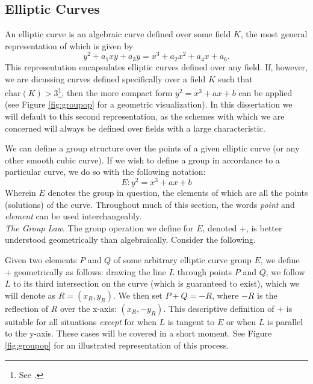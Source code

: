 \subsection{Elliptic Curves}

An elliptic curve is an algebraic curve defined over some field $K$, the most general representation of which is given by
$$
y^2 + a_{1}xy + a_{3}y = x^3 + a_{2}x^2 + a_{4}x + a_6.
$$
This representation encapsulates elliptic curves defined over any field. If, however, we are dicussing curves defined specifically over a field $K$ such that $\text{char}(K) > 3$\footnote{See \cite{silverman}.}, then the more compact form $y^2 = x^3 + ax + b$ can be applied (see Figure \ref{fig:groupop} for a geometric visualization). In this dissertation we will default to this second representation, as the schemes with which we are concerned will always be defined over fields with a large characteristic.

We can define a group structure over the points of a given elliptic curve (or any other smooth cubic curve). If we wish to define a group in accordance to a particular curve, we do so with the following notation:
$$
E: y^2 = x^3 + ax + b
$$
Wherein $E$ denotes the group in question, the elements of which are all the points (solutions) of the curve. Throughout much of this section, the words \emph{point} and \emph{element} can be used interchangeably.\\

\noindent
\emph{The Group Law}. The group operation we define for $E$, denoted $+$, is better understood geometrically than algebraically. Consider the following.

Given two elements $P$ and $Q$ of some arbitrary elliptic curve group $E$, we define $+$ geometrically as follows: drawing the line $L$ through points $P$ and $Q$, we follow $L$ to its third intersection on the curve (which is guaranteed to exist), which we will denote as $R = (x_R, y_R)$. We then set $P + Q = -R$, where $-R$ is the reflection of $R$ over the x-axis: $(x_R, -y_R)$. This descriptive definition of $+$ is suitable for all situations \emph{except} for when $L$ is tangent to $E$ or when $L$ is parallel to the y-axis. These cases will be covered in a short moment. See Figure \ref{fig:groupop} for an illustrated representation of this process.

